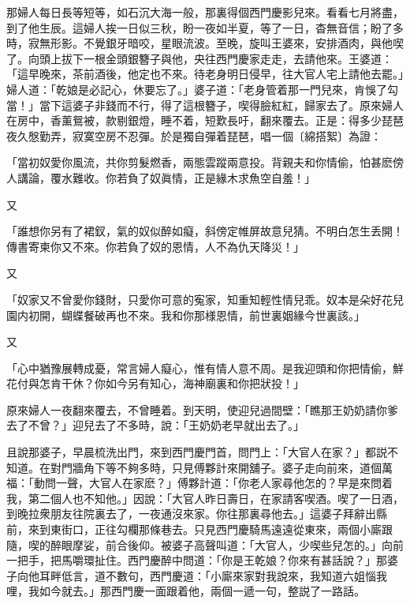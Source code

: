 那婦人每日長等短等，如石沉大海一般，那裏得個西門慶影兒來。看看七月將盡，到了他生辰。這婦人挨一日似三秋，盼一夜如半夏，等了一日，杳無音信；盼了多時，寂無形影。不覺銀牙暗咬，星眼流波。至晚，旋叫王婆來，安排酒肉，與他喫了。向頭上拔下一根金頭銀簪子與他，央往西門慶家走走，去請他來。王婆道：「這早晚來，茶前酒後，他定也不來。待老身明日侵早，往大官人宅上請他去罷。」婦人道：「乾娘是必記心，休要忘了。」婆子道：「老身管着那一門兒來，肯悞了勾當！」當下這婆子非錢而不行，得了這根簪子，喫得臉紅紅，歸家去了。原來婦人在房中，香薰鴛被，款剔銀燈，睡不着，短歎長吁，翻來覆去。正是：得多少琵琶夜久慇勤弄，寂寞空房不忍彈。於是獨自彈着琵琶，唱一個〔綿搭絮〕為證：

\begin{myquote}
「當初奴愛你風流，共你剪髮燃香，兩態雲蹤兩意投。背親夫和你情偷，怕甚麽傍人講論，覆水難收。你若負了奴眞情，正是緣木求魚空自羞！」
\end{myquote}

又
\begin{myquote}
「誰想你另有了裙釵，氣的奴似醉如癡，斜傍定帷屏故意兒猜。不明白怎生丢開！傳書寄柬你又不來。你若負了奴的恩情，人不為仇天降災！」
\end{myquote}

又
\begin{myquote}
「奴家又不曾愛你錢財，只愛你可意的寃家，知重知輕性情兒乖。奴本是朵好花兒園内初開，蝴蝶餐破再也不來。我和你那様恩情，前世裏姻緣今世裏該。」
\end{myquote}

又
\begin{myquote}
「心中猶豫展轉成憂，常言婦人癡心，惟有情人意不周。是我迎頭和你把情偷，鮮花付與怎肯干休？你如今另有知心，海神廟裏和你把狀投！」
\end{myquote}

原來婦人一夜翻來覆去，不曾睡着。到天明，使迎兒過間壁：「瞧那王奶奶請你爹去了不曾？」迎兒去了不多時，說：「王奶奶老早就出去了。」

且說那婆子，早晨梳洗出門，來到西門慶門首，問門上：「大官人在家？」都説不知道。在對門牆角下等不夠多時，只見傅夥計來開舖子。婆子走向前來，道個萬福：「動問一聲，大官人在家麽？」傅夥計道：「你老人家尋他怎的？早是來問着我，第二個人也不知他。」因說：「大官人昨日壽日，在家請客喫酒。喫了一日酒，到晚拉衆朋友往院裏去了，一夜通沒來家。你往那裏尋他去。」這婆子拜辭出縣前，來到東街口，正往勾欄那條巷去。只見西門慶騎馬遠遠從東來，兩個小廝跟隨，喫的醉眼摩娑，前合後仰。被婆子高聲叫道：「大官人，少喫些兒怎的。」向前一把手，把馬嚼環扯住。西門慶醉中問道：「你是王乾娘？你來有甚話說？」那婆子向他耳畔低言，道不數句，西門慶道：「小廝來家對我說來，我知道六姐惱我哩，我如今就去。」那西門慶一面跟着他，兩個一遞一句，整説了一路話。

